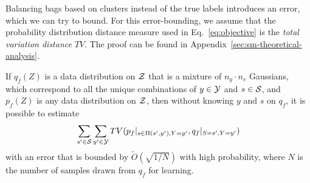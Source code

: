 Balancing bags based on clusters instead of the true labels introduces an error, which we can try
to bound. 
%
For this error-bounding, we assume that the probability distribution distance measure used in
Eq.~\ref{eq:objective} is the \emph{total variation distance} \(TV\). 
%
The proof can be found in Appendix~\ref{sec:sm-theoretical-analysis}.

\begin{theorem}
%
If \(q_f(Z)\) is a data distribution on \({\mathcal{Z}}\) that is a mixture of \(n_y\cdot n_s\) Gaussians,
which correspond to all the unique combinations of \(y\in{\mathcal{Y}}\) and \(s\in{\mathcal{S}}\), and \(p_f(Z)\) is
any data distribution on \({\mathcal{Z}}\), then without knowing \(y\) and \(s\) on \(q_f\), it is possible
to estimate
%
\begin{align}
  \sum\limits_{s^\prime\in{\mathcal{S}}}\sum\limits_{y^\prime\in{\mathcal{Y}}} TV(p_f|_{s\in
  \Pi(s^\prime,y^\prime),Y=y^\prime},
q_f|_{S=s^\prime,Y=y^\prime})
\end{align}
%
with an error that is bounded by \(\tilde{O}(\sqrt{1/N})\) with high probability, where \(N\) is
the number of samples drawn from \(q_f\) for learning.
%
\end{theorem}
%
